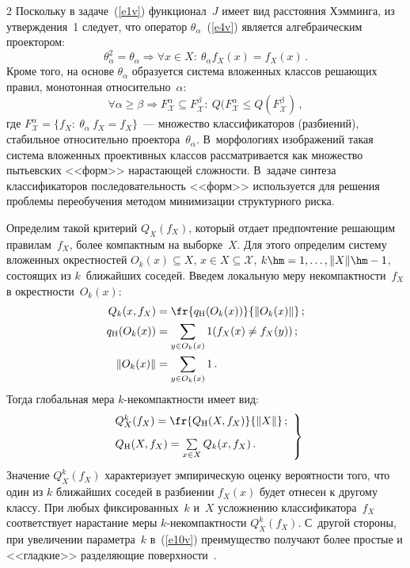 \begin{multicols}{2}
Поскольку в задаче~(\ref{e1v}) функционал~$J$ имеет вид расстояния Хэмминга, из 
утверждения~1 следует, что оператор $\theta_\alpha$~(\ref{e4v}) является алгебраическим 
проектором:
\begin{equation*}
\theta_\alpha^2=\theta_\alpha\Rightarrow \forall x\in X:\ \theta_{\alpha} f_X(x)=f_X(x)\,.
\end{equation*}
Кроме того, на основе $\theta_\alpha$ образуется система вложенных классов решающих правил, 
монотонная относительно~$\alpha$: 
\begin{equation*}
\forall \alpha \geq \beta \Rightarrow F^\alpha_{\mathcal{X}}\subseteq F^\beta_{\mathcal{X}}:\ 
Q(F^\alpha_{\mathcal{X}}\leq Q(F^\beta_{\mathcal{X}})\,,
\end{equation*}
где $F^\alpha_{\mathcal{X}}= \{ f_X:\ \theta_\alpha\ f_X=f_X\}$~--- множество классификаторов 
(разбиений), стабильное относительно проектора~$\theta_\alpha$. В~морфологиях изображений 
такая система вложенных проективных классов рас\-смат\-ри\-ва\-ет\-ся как множество пытьевских 
<<форм>> на\-рас\-та\-ющей сложности. В~задаче синтеза классификаторов последовательность 
<<форм>> используется для решения проблемы переобучения методом минимизации 
структурного риска.

Определим такой критерий $Q_X(f_X)$, который отдает предпочтение решающим 
правилам~$f_X$, более компактным на выборке~$X$. Для этого определим систему вложенных 
окрестностей $O_k(x)\subseteq X$, $x\in X\subseteq \mathcal{X}$, $k\hm=1, \ldots , \Vert X\Vert\hm-
1$, состоящих из $k$~ближайших соседей. Введем локальную меру некомпактности~$f_X$ в 
окрестности~$O_k(x)$:
\begin{align*}
Q_k(x, f_X) &= \fr{q_{\mathrm{H}}(O_k(x))}{\Vert O_k(x)\Vert}\,;\\
q_{\mathrm{H}}(O_k(x)) &= \sum\limits_{y\in O_k(x)} 1(f_X(x)\not= f_X(y))\,;\\
\Vert O_k(x)\Vert &= \sum\limits_{y\in O_k(x)} 1\,.
\end{align*}
Тогда глобальная мера $k$-не\-ком\-пакт\-ности имеет вид:
\begin{equation}
\left.
\begin{array}{l}
Q^k_X(f_X)=\fr{Q_{\mathrm{H}}(X, f_X)}{\Vert X\Vert}\,;\\[9pt]
Q_{\mathrm{H}}(X, f_X)=\sum\limits_{x\in X} Q_k(x, f_X)\,.
\end{array}
\right\}
\label{e10v}
\end{equation}
Значение $Q^k_X(f_X)$ характеризует эмпирическую оценку вероятности того, что 
один из $k$ ближайших соседей в разбиении $f_X(x)$ будет отнесен к другому классу. При любых 
фиксированных~$k$ и~$X$ усложнению классификатора~$f_X$ соответствует нарастание меры 
$k$-не\-ком\-пакт\-ности $Q^k_X(f_X)$. С~другой стороны, при увеличении параметра~$k$ 
в~(\ref{e10v}) преимущество получают более простые и <<гладкие>> разделяющие 
поверхности~\cite{9v}.


\end{multicols}
